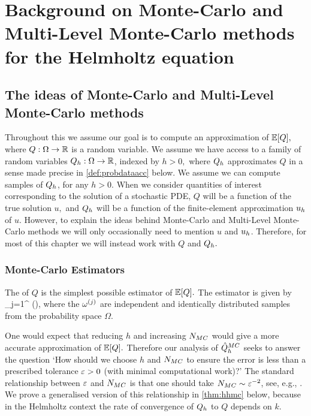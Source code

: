 \section[Background on MC and MLMC]{Background on Monte-Carlo and Multi-Level Monte-Carlo methods for the Helmholtz equation}\label{sec:overview}
\subsection{The ideas of Monte-Carlo and Multi-Level Monte-Carlo methods}\label{sec:mlmcideasoverview}
Throughout this  we assume our goal is to compute an approximation of $\EXP{Q},$ where $Q:\Omega\rightarrow\mathbb R$ is a random variable. We assume we have access to a family of random variables $Q_{h}:\Omega\rightarrow\mathbb R$, indexed by $h>0,$ where $Q_{h}$ approximates $Q$ in a sense made precise in \cref{def:probdataacc} below. We assume we can compute samples of $Q_{h}$, for any $h>0$. When we consider quantities of interest corresponding to the solution of a stochastic PDE, $Q$ will be a function of the true solution $u,$ and $Q_{h}$ will be a function of the finite-element approximation $u_{h}$ of $u.$ However, to explain the ideas behind Monte-Carlo and Multi-Level Monte-Carlo methods we will only occasionally need to mention $u$ and $u_{h}$. Therefore, for most of this chapter we will instead work with $Q$ and $Q_{h}.$

\subsubsection{Monte-Carlo Estimators}

The  of $Q$ is the simplest possible estimator of $\EXP{Q}.$ The estimator is given by
\beqs
\QhatMC \de {} \sum_{j=1}^{\NMC} \Qh\mleft(\omegasj\mright),
\eeqs
where the $\omega^{(j)}$ are independent and identically distributed samples from the probability space $\Omega$.

One would expect that reducing $h$ and increasing $N_{MC}$ would give a more accurate approximation of $\EXP{Q}.$ Therefore our analysis of $\hat{Q}^{MC}_{h}$ seeks to answer the question `How should we choose $h$ and $N_{MC}$ to ensure the error is less than a prescribed tolerance $\varepsilon>0$ (with minimal computational work)?' The standard relationship between $\varepsilon$ and $N_{MC}$ is that one should take $N_{MC} \sim \varepsilon^{-2}$, see, e.g., \cite[Text after equation (3)]{ClGiScTe:11}. We prove a generalised version of this relationship in \cref{thm:hhmc} below, because in the Helmholtz context the rate of convergence of $Q_{h}$ to $Q$ depends on $k.$


